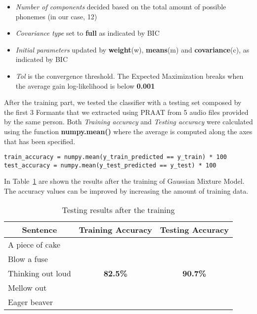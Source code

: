 \begin{itemize}
	\item \textit{Number of components} decided based on the total amount of possible phonemes (in our case, 12)
	\item \textit{Covariance type} set to \textbf{full} as indicated by BIC
	\item \textit{Initial parameters} updated by \textbf{weight}(w), \textbf{means}(m) and \textbf{covariance}(c), as indicated by BIC
	\item \textit{Tol} is the convergence threshold. The Expected Maximization breaks when the average gain log-likelihood is below \textbf{0.001}
\end{itemize}

\noindent After the training part, we tested the classifier with a testing set composed by the first 3 Formants that we extracted using PRAAT from 5 audio files provided by the same person. Both \textit{Training accuracy} and \textit{Testing accuracy} were calculated using the function \textbf{numpy.mean()} where the average is computed along the axes that has been specified.

\begin{lstlisting}[caption={Code for accuracy estimation of training and testing set},label={lst:accuracy}, style=BashInputStyle]
train_accuracy = numpy.mean(y_train_predicted == y_train) * 100
test_accuracy = numpy.mean(y_test_predicted == y_test) * 100
\end{lstlisting}

\noindent In Table~\ref{table:accuracy} are shown the results after the training of Gaussian Mixture Model. The accuracy values can be improved by increasing the amount of training data.

\begin{table}[!ht]
	\centering
	\caption{Testing results after the training}
	\label{table:accuracy}
	\begin{tabular}{|l|c|c|}
		\hline
		\multicolumn{1}{|c|}{\textbf{Sentence}} & \textbf{Training Accuracy}       & \textbf{Testing Accuracy}        \\ \hline
		A piece of cake                         & 								   &
		\\ \cline{1-1}
		Blow a fuse                             &                                  &                                  \\ \cline{1-1}
		Thinking out loud                       &  \textbf{82.5\%}                 & \textbf{90.7\%}
		\\ \cline{1-1}
		Mellow out                              &                                  &                                  \\ \cline{1-1}
		Eager beaver                            &                                  &                                  \\ \hline
	\end{tabular}
\end{table}

